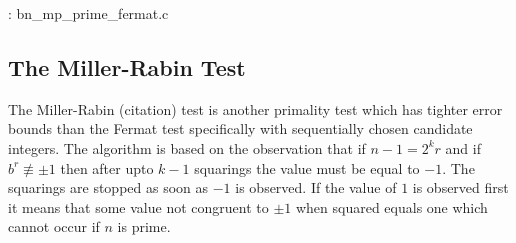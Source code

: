 \documentclass[b5paper]{book}
\def\nequiv{\not\equiv}
\begin{document}
\vspace{+3mm}\begin{small}
\hspace{-5.1mm}{\bf File}: bn\_mp\_prime\_fermat.c
\vspace{-3mm}
\begin{alltt}
\end{alltt}
\end{small}

\subsection{The Miller-Rabin Test}
The Miller-Rabin (citation) test is another primality test which has tighter error bounds than the Fermat test specifically with sequentially chosen 
candidate  integers.  The algorithm is based on the observation that if $n - 1 = 2^kr$ and if $b^r \nequiv \pm 1$ then after upto $k - 1$ squarings the 
value must be equal to $-1$.  The squarings are stopped as soon as $-1$ is observed.  If the value of $1$ is observed first it means that
some value not congruent to $\pm 1$ when squared equals one which cannot occur if $n$ is prime.
\end{document}
